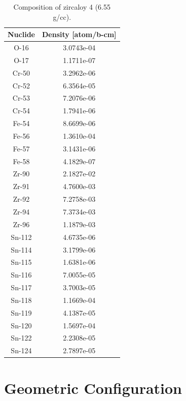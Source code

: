 \begin{appendices}
\begin{table}[h!]
  \centering
  \caption[BEAVRS isotopic composition for zircaloy]{Composition of zircaloy 4 (6.55 g/cc).}
  \footnotesize
  \label{table:chap7-beavrs-isotopes-3.1-zircaloy}
  \vspace{6pt}
  \begin{tabular}{c c}
  \toprule
  \rowcolor{lightgray}
  {\bf Nuclide} &
  {\bf Density [atom/b-cm]} \\
  \midrule
  O-16 & 3.0743e-04 \\
  O-17 & 1.1711e-07 \\
  Cr-50 & 3.2962e-06 \\
  Cr-52 & 6.3564e-05 \\
  Cr-53 & 7.2076e-06 \\
  Cr-54 & 1.7941e-06 \\
  Fe-54 & 8.6699e-06 \\
  Fe-56 & 1.3610e-04 \\
  Fe-57 & 3.1431e-06 \\
  Fe-58 & 4.1829e-07 \\
  Zr-90 & 2.1827e-02 \\
  Zr-91 & 4.7600e-03 \\
  Zr-92 & 7.2758e-03 \\
  Zr-94 & 7.3734e-03 \\
  Zr-96 & 1.1879e-03 \\
  Sn-112 & 4.6735e-06 \\
  Sn-114 & 3.1799e-06 \\
  Sn-115 & 1.6381e-06 \\
  Sn-116 & 7.0055e-05 \\
  Sn-117 & 3.7003e-05 \\
  Sn-118 & 1.1669e-04 \\
  Sn-119 & 4.1387e-05 \\
  Sn-120 & 1.5697e-04 \\
  Sn-122 & 2.2308e-05 \\
  Sn-124 & 2.7897e-05 \\
  \bottomrule
\end{tabular}
\end{table}

\clearpage

\section{Geometric Configuration}
\label{sec:beavrs-geometry}


\end{appendices}
